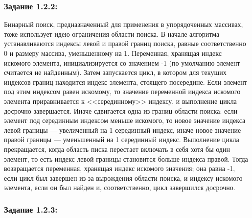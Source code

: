 \documentclass[12pt]{article}
\begin{document}
{	 
	
	\subsubsection{Задание 1.2.2:}
	\label{task_1_2_2}
	
	Бинарный поиск, предназначенный для применения в упорядоченных массивах, тоже использует идею ограничения области поиска. В начале алгоритма устанавливаются индексы левой и правой границ поиска, равные соответственно 0 и размеру массива, уменьшенному на 1. Переменная, хранящая индекс искомого элемента, инициализируется со значением -1 (по умолчанию элемент считается не найденным). Затем запускается цикл, в котором для текущих индексов границ находится индекс элемента, стоящего посередине. Если элемент под этим индексом равен искомому, то значение переменной индекса искомого элемента приравнивается к <<серединному>> индексу, и выполнение цикла досрочно завершается. Иначе сдвигается одна из границ области поиска: если элемент под серединным индексом меньше искомого, то новое значение индекса левой границы --- увеличенный на 1 серединный индекс, иначе новое значение правой границы --- уменьшенный на 1 серединный индекс. Выполнение цикла прекращается, когда область писка перестает включать в себя хотя бы один элемент, то есть индекс левой границы становится больше индекса правой. Тогда возвращается переменная, хранящая индекс искомого значения; она равна -1, если цикл был завершен из-за вырождения области поиска, и индексу искомого элемента, если он был найден и, соответственно, цикл завершился досрочно.
	
	 
	
	\subsubsection{Задание 1.2.3:}
	\label{task_1_2_3}
	
}
\end{document}
